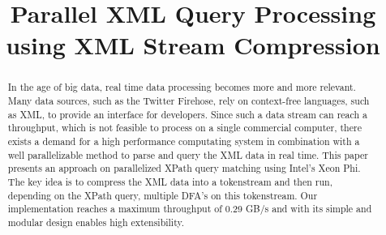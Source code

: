 \documentclass[letterpaper]{article}
\title{Parallel XML Query Processing using XML Stream Compression}
\begin{document}
%
\maketitle
%

\begin{abstract}
In the age of big data, real time data processing becomes more and more
relevant. Many data sources, such as the Twitter Firehose, rely on context-free
languages, such as XML, to provide an interface for developers. Since such a 
data stream can reach a throughput, which is not feasible to process
on a single commercial computer, there exists a demand for a high performance 
computating system in combination with a well parallelizable method to parse and query
the XML data in real time. This paper presents an approach on parallelized XPath 
query matching using Intel's Xeon Phi. The key idea is to compress the XML data 
into a tokenstream and then run, depending on the XPath query, multiple DFA's on this
tokenstream. Our implementation reaches a maximum throughput of 0.29 GB/s and
with its simple and modular design enables high extensibility.
\end{abstract}
















\end{document}
